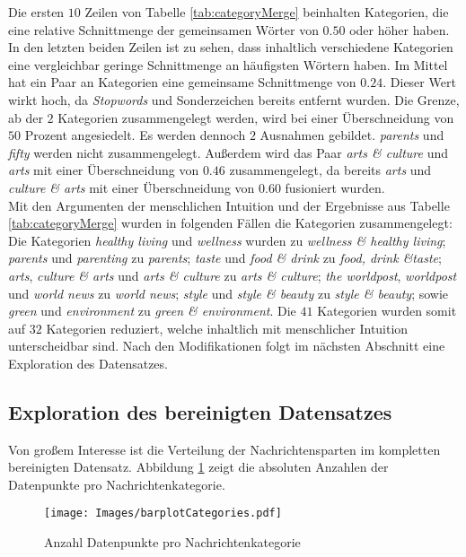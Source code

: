 \documentclass[a4paper,11pt]{article}
\begin{document}
Die ersten $10$ Zeilen von Tabelle \ref{tab:categoryMerge} beinhalten Kategorien, die eine relative Schnittmenge der gemeinsamen Wörter von $0.50$ oder höher haben. In den letzten beiden Zeilen ist zu sehen, dass inhaltlich verschiedene Kategorien eine vergleichbar geringe Schnittmenge an häufigsten Wörtern haben. Im Mittel hat ein Paar an Kategorien eine gemeinsame Schnittmenge von $0.24$. Dieser Wert wirkt hoch, da \textit{Stopwords} und Sonderzeichen bereits entfernt wurden.
Die Grenze, ab der $2$ Kategorien zusammengelegt werden, wird bei einer Überschneidung von $50$ Prozent angesiedelt. Es werden dennoch $2$ Ausnahmen gebildet. \textit{parents} und \textit{fifty} werden nicht zusammengelegt. Außerdem wird das Paar \textit{arts \& culture} und \textit{arts} mit einer Überschneidung von $0.46$ zusammengelegt, da bereits \textit{arts} und \textit{culture \& arts} mit einer Überschneidung von $0.60$ fusioniert wurden.\\
Mit den Argumenten der menschlichen Intuition und der Ergebnisse aus Tabelle \ref{tab:categoryMerge} wurden in folgenden Fällen die Kategorien zusammengelegt:
Die Kategorien \textit{healthy living} und \textit{wellness} wurden zu \textit{wellness \& healthy living}; \textit{parents} und \textit{parenting}  zu \textit{parents}; \textit{taste} und \textit{food \& drink} zu \textit{food, drink \&taste}; \textit{arts}, \textit{culture \& arts} und \textit{arts \& culture} zu \textit{arts \& culture}; \textit{the worldpost}, \textit{worldpost} und \textit{world news} zu \textit{world news}; \textit{style} und \textit{style \& beauty} zu \textit{style \& beauty};  sowie \textit{green} und \textit{environment} zu \textit{green \& environment}. Die $41$ Kategorien wurden somit auf $32$ Kategorien reduziert, welche inhaltlich mit menschlicher Intuition unterscheidbar sind. Nach den Modifikationen folgt im nächsten Abschnitt eine Exploration des Datensatzes.

\subsection{Exploration des bereinigten Datensatzes}\label{kap:exploration}

Von großem Interesse ist die Verteilung der Nachrichtensparten im kompletten bereinigten Datensatz.
Abbildung \ref{abb:barplotCategories} zeigt die absoluten Anzahlen der Datenpunkte pro Nachrichtenkategorie. 

\begin{figure}[ht]
    \centering
\texttt{[image: Images/barplotCategories.pdf]} 
\caption{Anzahl Datenpunkte pro Nachrichtenkategorie}
\label{abb:barplotCategories}
\end{figure}
\end{document}
